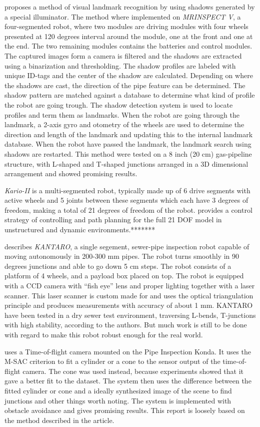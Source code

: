 \cite{MRINSPECT-V} proposes a method of visual landmark recognition by using shadows
generated by a special illuminator. The method where implemented on \emph{MRINSPECT V}, a
four-segmented robot, where two modules are driving modules with four wheels presented at
120 degrees interval around the module, one at the front and one at the end. The two
remaining modules contains the batteries and control modules. 
The captured images form a camera is filtered and the
shadows are extracted using a binarization and thresholding. The shadow profiles are
labeled with unique ID-tags and the center of the shadow are calculated. Depending on
where the shadows are cast, the direction of the pipe feature can be determined. The
shadow pattern are matched against a database to determine what kind of profile the robot
are going trough. The shadow detection system is used to locate profiles and term them as
landmarks. When the robot are going through the landmark, a 2-axis gyro and otometry of
the wheels are used to determine the direction and length of the landmark and updating
this to the internal landmark database. When the robot have passed the landmark, the 
landmark search using shadows are restarted. This method were tested on a 8 inch (20 cm)
gas-pipeline structure, with L-shaped and T-shaped junctions arranged in a 3D dimensional
arrangement and showed promising results. 


\emph{Kario-II} is a multi-segmented robot, typically made up of 6 drive segments with
active wheels and 5 joints between these segments which each have 3 degrees of freedom,
making a total of 21 degrees of freedom of the robot. \cite{Kairo-II} provides a control
strategy of controlling and path planning for the full 21 DOF model in unstructured and
dynamic environments.******* 


\cite{KANTARO} describes \emph{KANTARO}, a single segement, sewer-pipe inspection robot 
capable of moving autonomously in 200-300 mm pipes. The robot turns smoothly in 90 degrees 
junctions and able to go down 5 cm steps. The robot consists of a platform of 4 wheels,
and a payload box placed on top. The robot is equipped with a CCD camera with ``fish eye''
lens and proper lighting together with a laser scanner. This laser scanner is custom made
for and uses the optical triangulation principle and produces measurements with accuracy
of about 1 mm. KANTARO have been tested in a dry sewer test environment, traversing
L-bends, T-junctions with high stability, according to the authors. But much work is still
to be done with regard to make this robot robust enough for the real world. 

\cite{KURT}


\cite{sintef-tof} uses a Time-of-flight camera mounted on the Pipe Inspection Konda. It
uses the M-SAC criterion to fit a cylinder or a cone to the sensor output of the
time-of-flight camera. The cone was used instead, because experiments showed that it gave
a better fit to the dataset. The system then uses the difference between the fitted
cylinder or cone and
a ideally synthesized image of the scene to find junctions and other things worth noting.
The system is implemented with obstacle avoidance and gives promising results. This report
is loosely based on the method described in the article. 


